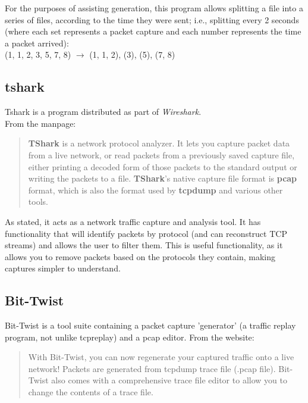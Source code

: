 \documentclass[10pt,a4paper,notitlepage]{report}
\begin{document}
For the purposes of assisting generation, this program allows splitting a file into a series of files, according to the time they were sent; i.e., splitting every 2 seconds (where each set represents a packet capture and each number represents the time a packet arrived):\\
\indent (1, 1, 2, 3, 5, 7, 8) $\rightarrow$ (1, 1, 2), (3), (5), (7, 8)

\subsection{tshark}
Tshark is a program distributed as part of \emph{Wireshark}.\\
From the manpage\cite{tshark-man}:
\begin{quote}
\textbf{TShark} is a network protocol analyzer. It lets you capture packet data from a live network, or read packets from a previously saved capture file, either printing a decoded form of those packets to the standard output or writing the packets to a file.  \textbf{TShark}'s native capture file format is \textbf{pcap} format, which is also the format used by \textbf{tcpdump} and various other tools.
\end{quote}

As stated, it acts as a network traffic capture and analysis tool. It has functionality that will identify packets by protocol (and can reconstruct TCP streams) and allows the user to filter them. This is useful functionality, as it allows you to remove packets based on the protocols they contain, making captures simpler to understand.

\subsection{Bit-Twist}
Bit-Twist is a tool suite containing a packet capture 'generator' (a traffic replay program, not unlike tcpreplay\cite{tcpreplay-web}) and a pcap editor.
From the website\cite{bittwist-web}:

\begin{quote}
With Bit-Twist, you can now regenerate your captured traffic onto a live network! Packets are generated from tcpdump trace file (.pcap file). Bit-Twist also comes with a comprehensive trace file editor to allow you to change the contents of a trace file.
\end{quote}
\end{document}
